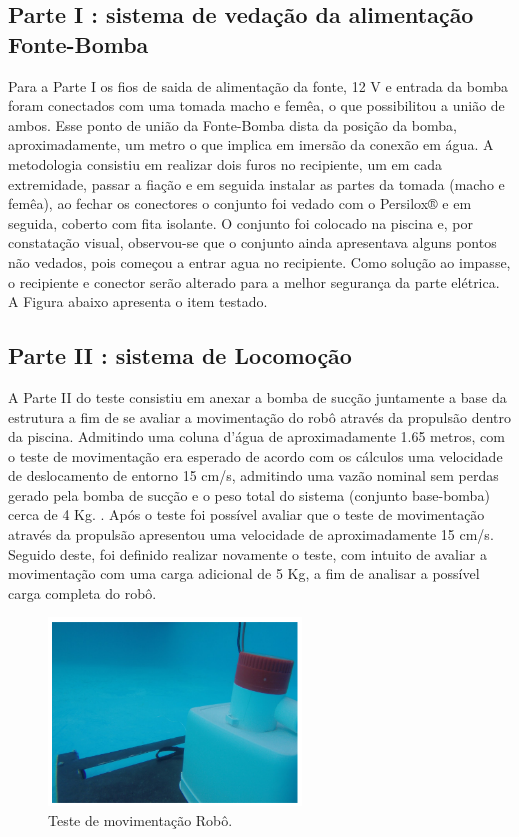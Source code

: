 \subsection{Parte I : sistema de vedação da alimentação Fonte-Bomba}
Para a Parte I os fios de saida de alimentação da fonte, 12 V e entrada da bomba foram conectados com uma tomada macho e femêa, o que possibilitou a união de ambos. Esse ponto de união da Fonte-Bomba dista da posição da bomba, aproximadamente, um metro o que implica em imersão da conexão em água. A metodologia consistiu em realizar dois furos no recipiente, um em cada extremidade, passar a fiação e em seguida instalar as partes da tomada (macho e femêa), ao fechar os conectores o conjunto foi vedado com o Persilox® e em seguida, coberto com fita isolante. O conjunto foi colocado na piscina e, por constatação visual, observou-se que o conjunto ainda apresentava alguns pontos não vedados, pois começou a entrar agua no recipiente. Como solução ao impasse, o recipiente e conector serão alterado para a melhor segurança da parte elétrica. A Figura abaixo apresenta o item testado.

\subsection{Parte II : sistema de Locomoção}
A Parte II do teste consistiu em anexar a bomba de sucção juntamente a base da estrutura a fim de se avaliar a movimentação do robô através da propulsão dentro da piscina. Admitindo uma coluna d’água de aproximadamente 1.65 metros, com o teste de movimentação era esperado de acordo com os cálculos uma velocidade de deslocamento de entorno 15 cm/s, admitindo uma vazão nominal sem perdas gerado pela bomba de sucção e o peso total do sistema (conjunto base-bomba) cerca de 4 Kg. .	Após o teste foi possível avaliar que o teste de movimentação através da propulsão apresentou uma velocidade de aproximadamente 15 cm/s. Seguido deste, foi definido realizar novamente o teste, com intuito de avaliar a movimentação com uma carga adicional de 5 Kg, a fim de analisar a possível carga completa do robô.

\par
\begin{figure}[h]
  \centering
  \includegraphics[width=0.6\textwidth]{figures/test.png}
  \caption{Teste de movimentação Robô.}
  \label{fig:test}
\end{figure}
\FloatBarrier
\par

